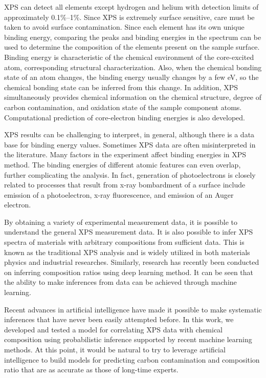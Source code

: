 \documentclass[preprint,aps,floatfix,showpacs]{revtex4-2}
\begin{document}
XPS can detect all elements except hydrogen and helium with detection
limits of approximately 0.1\%–1\%.
Since XPS is extremely surface sensitive, care must be taken to avoid surface contamination.
Since each element has its own unique binding energy, comparing the peaks and binding energies in the spectrum can be used to determine the composition of the elements present on the sample surface.
Binding energy is characteristic of the chemical environment of the core-excited atom, corresponding structural characterization.
Also, when the chemical bonding state of an atom changes, the binding energy usually changes by a few eV, so the chemical bonding state can be inferred from this change. 
In addition, XPS simultaneously provides chemical information on the chemical structure, degree of carbon contamination, and oxidation state of the sample component atoms. 
Computational prediction of core-electron binding energies is also developed\cite{golze2022accurate,sun2022machine}.




XPS results can be challenging to interpret, in general, although there is a data base for binding energy values\cite{chastain1992handbook,crist2019xps}. 
Sometimes XPS data are often misinterpreted in the literature. 
Many factors in the experiment affect binding energies in XPS method. 
The binding energies of different atomic features can even overlap, further complicating the analysis.
In fact, generation of photoelectrons is closely related to processes that result from x-ray bombardment of a surface include emission of a photoelectron,  x-ray fluorescence, and emission of an Auger electron.

By obtaining a variety of experimental measurement data, it is possible to understand the general XPS measurement data.  
It is also possible to infer XPS spectra of materials with arbitrary compositions from sufficient data.
This is known as the traditional XPS analysis and is widely utilized in both materials physics and industrial researches. 
Similarly, research has recently been conducted on inferring composition ratios using deep learning method\cite{drera2020deep}. It can be seen that the ability to make inferences from data can be achieved through machine learning. 

Recent advances in artificial intelligence have made it possible to make systematic inferences that have never been easily attempted before\cite{goodfellow2016deep}. In this work, we developed and tested a model for correlating XPS data with chemical composition using probabilistic inference supported by recent machine learning methods. 
At this point, it would be natural to try to leverage artificial intelligence to build models for predicting carbon contamination and composition ratio that are as accurate as those of long-time experts.
\end{document}

